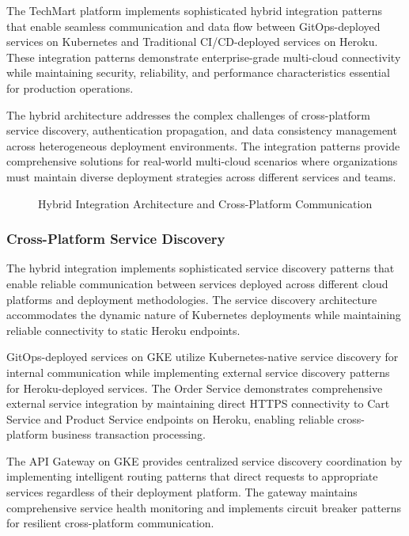 The TechMart platform implements sophisticated hybrid integration patterns that enable seamless communication and data flow between GitOps-deployed services on Kubernetes and Traditional CI/CD-deployed services on Heroku. These integration patterns demonstrate enterprise-grade multi-cloud connectivity while maintaining security, reliability, and performance characteristics essential for production operations.

The hybrid architecture addresses the complex challenges of cross-platform service discovery, authentication propagation, and data consistency management across heterogeneous deployment environments. The integration patterns provide comprehensive solutions for real-world multi-cloud scenarios where organizations must maintain diverse deployment strategies across different services and teams.

\begin{figure}[H]
\centering
\caption{Hybrid Integration Architecture and Cross-Platform Communication}
\label{fig:hybrid-integration-architecture}
\end{figure}

\subsubsection{Cross-Platform Service Discovery}

The hybrid integration implements sophisticated service discovery patterns that enable reliable communication between services deployed across different cloud platforms and deployment methodologies. The service discovery architecture accommodates the dynamic nature of Kubernetes deployments while maintaining reliable connectivity to static Heroku endpoints.

GitOps-deployed services on GKE utilize Kubernetes-native service discovery for internal communication while implementing external service discovery patterns for Heroku-deployed services. The Order Service demonstrates comprehensive external service integration by maintaining direct HTTPS connectivity to Cart Service and Product Service endpoints on Heroku, enabling reliable cross-platform business transaction processing.

The API Gateway on GKE provides centralized service discovery coordination by implementing intelligent routing patterns that direct requests to appropriate services regardless of their deployment platform. The gateway maintains comprehensive service health monitoring and implements circuit breaker patterns for resilient cross-platform communication.

